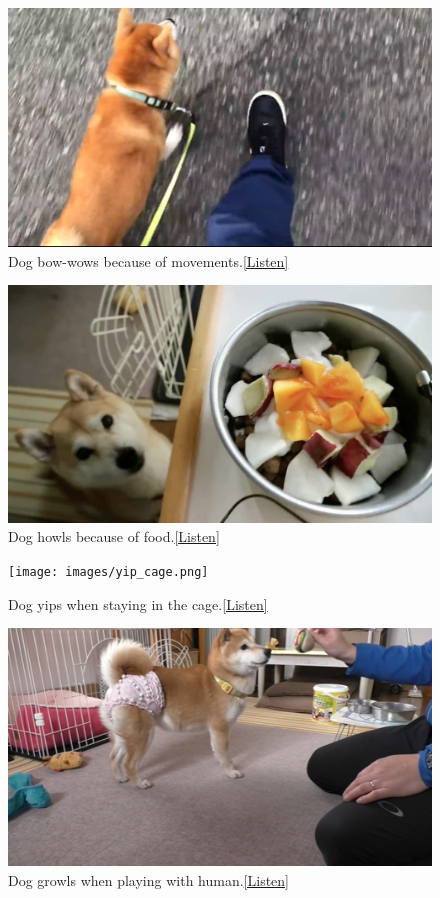 \begin{figure}[ht]
	\centering
	\includegraphics[width=0.6\columnwidth]{images/bowwow_walking.png}
	\caption{Dog bow-wows because of movements.\href{https://anonymous.4open.science/r/emnlp2023-937942/audios_in_paper/bowwow-walking.wav}{[Listen]}}
	\label{fig:bow-wow_walking}
\end{figure}

\begin{figure}[ht]
	\centering
	\includegraphics[width=0.6\columnwidth]{images/howl_food.png}
	\caption{Dog howls because of food.\href{https://anonymous.4open.science/r/emnlp2023-937942/audios_in_paper/howl-food.wav}{[Listen]}}
	\label{fig:howl_food}
\end{figure}

\begin{figure}[ht]
	\centering
	\texttt{[image: images/yip\_cage.png]}
	\caption{Dog yips when staying in the cage.\href{https://anonymous.4open.science/r/emnlp2023-937942/audios_in_paper/yip-cage-layingdown.wav}{[Listen]}}
	\label{fig:yip_cage}
\end{figure}

\begin{figure}[ht]
	\centering
	\includegraphics[width=0.6\columnwidth]{images/growl_play.png}
	\caption{Dog growls when playing with human.\href{https://anonymous.4open.science/r/emnlp2023-937942/audios_in_paper/growl-play.wav}{[Listen]}}
	\label{fig:growl_play}
\end{figure}

